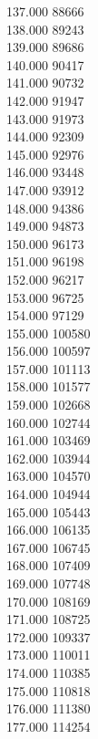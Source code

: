 { 137.000	88666 \\
 138.000	89243 \\
 139.000	89686 \\
 140.000	90417 \\
 141.000	90732 \\
 142.000	91947 \\
 143.000	91973 \\
 144.000	92309 \\
 145.000	92976 \\
 146.000	93448 \\
 147.000	93912 \\
 148.000	94386 \\
 149.000	94873 \\
 150.000	96173 \\
 151.000	96198 \\
 152.000	96217 \\
 153.000	96725 \\
 154.000	97129 \\
 155.000	100580 \\
 156.000	100597 \\
 157.000	101113 \\
 158.000	101577 \\
 159.000	102668 \\
 160.000	102744 \\
 161.000	103469 \\
 162.000	103944 \\
 163.000	104570 \\
 164.000	104944 \\
 165.000	105443 \\
 166.000	106135 \\
 167.000	106745 \\
 168.000	107409 \\
 169.000	107748 \\
 170.000	108169 \\
 171.000	108725 \\
 172.000	109337 \\
 173.000	110011 \\
 174.000	110385 \\
 175.000	110818 \\
 176.000	111380 \\
 177.000	114254 \\
}
